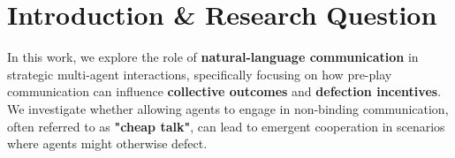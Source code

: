 \section{Introduction \& Research Question}
In this work, we explore the role of \textbf{natural-language communication} in strategic multi-agent interactions, specifically focusing on how pre-play communication can influence \textbf{collective outcomes} and \textbf{defection incentives}.
We investigate whether allowing agents to engage in non-binding communication, often referred to as \textbf{"cheap talk"}, can lead to emergent cooperation in scenarios where agents might otherwise defect.
